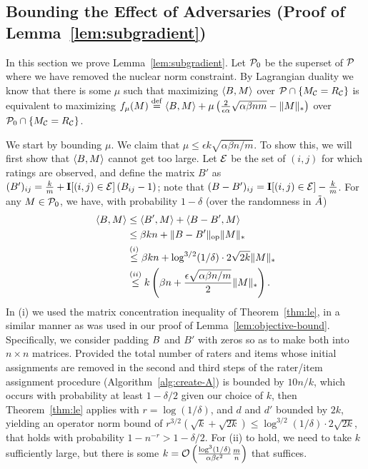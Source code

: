 \subsection{Bounding the Effect of Adversaries (Proof of Lemma~\ref{lem:subgradient})}
\label{sec:subgradient-proof}
In this section we prove Lemma~\ref{lem:subgradient}.
Let $\mathcal{P}_0$ be the superset of $\mathcal{P}$ where we have removed the 
nuclear norm constraint. By Lagrangian duality we 
know that there is some $\mu$ such that maximizing 
$\langle B, M \rangle$ over $\mathcal{P} \cap \{M_{\mathcal{C}} = R_{\mathcal{C}}\}$ 
is equivalent to maximizing $f_\mu(M) \stackrel{\rm def}{=} \langle B, M \rangle + \mu\left( \frac{2}{\epsilon\alpha}\sqrt{\alpha\beta nm} - \|M\|_* \right)$ over 
$\mathcal{P}_0 \cap \{M_{\mathcal{C}} = R_{\mathcal{C}}\}$. 

We start by bounding $\mu$. We claim that 
$\mu \leq \epsilon k \sqrt{\alpha\beta n/m}$. 
To show this, we will first show that $\langle B, M \rangle$ cannot get 
too large. Let $\mathcal{E}$ be the set of $(i,j)$ for which ratings are observed, 
and define the matrix $B'$ as 
$(B')_{ij} = \frac{k}{m} + \mathbf{I}[(i,j) \in \mathcal{E}]\left( B_{ij} - 1 \right)$; note 
that $(B-B')_{ij} = \mathbf{I}[(i,j) \in \mathcal{E}] - \frac{k}{m}$.
For any $M \in \mathcal{P}_0$, we have, with probability $1-\delta$ (over the randomness in $\tilde{A}$)
\begin{align}
\langle B, M \rangle &\leq \langle B', M \rangle + \langle B - B', M \rangle \\
 &\leq \beta kn + \|B - B'\|_{\mathrm{op}}\|M\|_* \\
 &\stackrel{(i)}{\leq} \beta kn + \log^{3/2}(1/\delta) \cdot 2\sqrt{2k}\|M\|_* \\
 &\stackrel{(ii)}{\leq} k\left( \beta n +  \frac{\epsilon\sqrt{\alpha\beta n/m}}{2} \|M\|_* \right).
\end{align}
In (i) we used the matrix concentration inequality of Theorem~\ref{thm:le}, in a similar manner as was used in our proof of Lemma~\ref{lem:objective-bound}.  Specifically, we consider padding $B$ and $B'$ with zeros so as to make both into $n\times n$ matrices. Provided the total number of raters and items whose initial assignments are removed in the second and third steps of the rater/item assignment procedure (Algorithm~\ref{alg:create-A}) is bounded by $10n/k$, which occurs with probability at least $1-\delta/2$ given our choice of $k$, then Theorem~\ref{thm:le} applies with $r = \log (1/\delta)$, and $d$ and $d'$ bounded by $2k$, yielding an operator norm bound of $r^{3/2}(\sqrt{k} +\sqrt{2k}) \le \log^{3/2}(1/\delta) \cdot 2\sqrt{2k}$, that holds with probability $1-n^{-r} > 1-\delta/2$.  For (ii) to hold, we need to take $k$ sufficiently large, but 
there is some $k = \mathcal{O}\left( \frac{\log^3(1/\delta)}{\alpha\beta\epsilon^2}\frac{m}{n} \right)$ 
that suffices.

